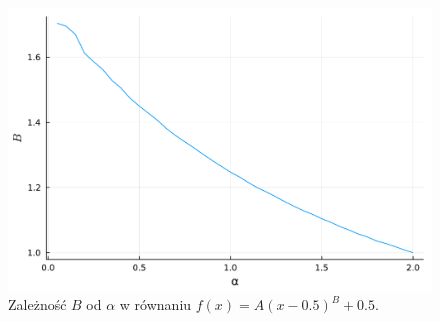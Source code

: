 \documentclass[12pt]{mwrep}
\begin{document}
	\begin{figure}[H]
		\includegraphics[width=\columnwidth]{fig/plot/A_B_out.pdf}\caption{Zależność $B$ od $\alpha$ w równaniu $f(x)=A\left(x-0.5\right)^B+0.5$.}
	\end{figure}



%	
%	
%	
\end{document}
